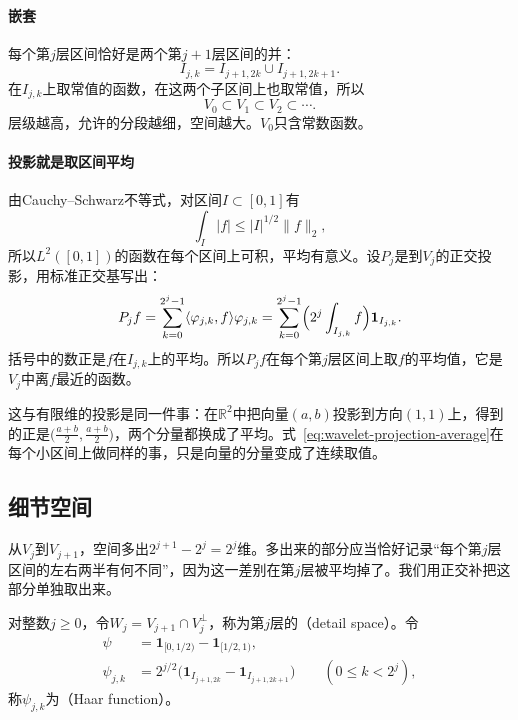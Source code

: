 \paragraph{嵌套}
每个第$j$层区间恰好是两个第$j+1$层区间的并：
\[
 I_{j,k}=I_{j+1,2k}\cup I_{j+1,2k+1}.
\]
在$I_{j,k}$上取常值的函数，在这两个子区间上也取常值，所以
\begin{equation}
 V_0\subset V_1\subset V_2\subset\cdots.
 \label{eq:wavelet-interval-nesting}
\end{equation}
层级越高，允许的分段越细，空间越大。$V_0$只含常数函数。

\paragraph{投影就是取区间平均}
由Cauchy--Schwarz不等式，对区间$I\subset[0,1]$有
\[
 \int_I\lvert f\rvert\leq\lvert I\rvert^{1/2}\lVert f\rVert_2,
\]
所以$L^2([0,1])$的函数在每个区间上可积，平均有意义。设$P_j$是到$V_j$的正交投影，用标准正交基写出：
\begin{equation}
 P_jf=\sum_{k=0}^{2^j-1}\langle\varphi_{j,k},f\rangle\varphi_{j,k}
 =\sum_{k=0}^{2^j-1}\Bigl(2^j\int_{I_{j,k}}f\Bigr)\mathbf{1}_{I_{j,k}}.
 \label{eq:wavelet-projection-average}
\end{equation}
括号中的数正是$f$在$I_{j,k}$上的平均。所以$P_jf$在每个第$j$层区间上取$f$的平均值，它是$V_j$中离$f$最近的函数。

这与有限维的投影是同一件事：在$\mathbb R^2$中把向量$(a,b)$投影到方向$(1,1)$上，得到的正是$\bigl(\frac{a+b}2,\frac{a+b}2\bigr)$，两个分量都换成了平均。式~\eqref{eq:wavelet-projection-average}在每个小区间上做同样的事，只是向量的分量变成了连续取值。

\subsection{细节空间}
\label{sec:wavelet-detail-spaces}

从$V_j$到$V_{j+1}$，空间多出$2^{j+1}-2^j=2^j$维。多出来的部分应当恰好记录“每个第$j$层区间的左右两半有何不同”，因为这一差别在第$j$层被平均掉了。我们用正交补把这部分单独取出来。

\begin{definition}[Haar细节空间与Haar函数]
\label{def:wavelet-detail-space}
对整数$j\geq0$，令$W_j=V_{j+1}\cap V_j^{\perp}$，称为第$j$层的（detail space）。令
\begin{align}
 \psi&=\mathbf{1}_{[0,1/2)}-\mathbf{1}_{[1/2,1)},
 \label{eq:wavelet-haar-mother}\\
 \psi_{j,k}&=2^{j/2}\bigl(\mathbf{1}_{I_{j+1,2k}}-\mathbf{1}_{I_{j+1,2k+1}}\bigr)
 \qquad(0\leq k<2^j),
 \label{eq:wavelet-haar-function}
\end{align}
称$\psi_{j,k}$为（Haar function）。
\end{definition}

